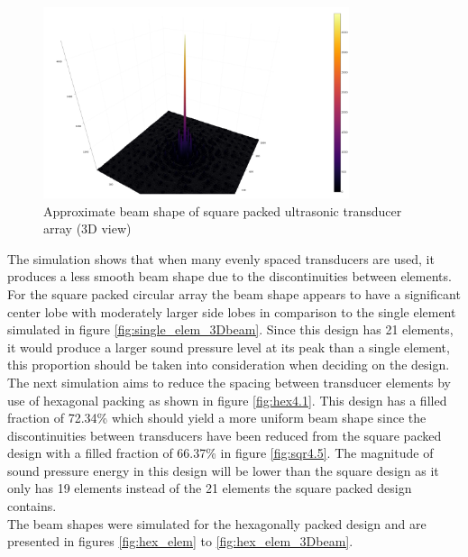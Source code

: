 \begin{figure}[ht!]
    \centering
    \includegraphics[width=0.8\textwidth]{Figures/arraySim/sqr/circ_sqr_beam3d.png}
    \caption{Approximate beam shape of square packed ultrasonic transducer array (3D view)}
    \label{fig:sqr_elem_3Dbeam}
\end{figure}

The simulation shows that when many evenly spaced transducers are used, it produces a less smooth beam shape due to the discontinuities between elements. For the square packed circular array the beam shape appears to have a significant center lobe with moderately larger side lobes in comparison to the single element simulated in figure \ref{fig:single_elem_3Dbeam}. Since this design has 21 elements, it would produce a larger sound pressure level at its peak than a single element, this proportion should be taken into consideration when deciding on the design.\\

The next simulation aims to reduce the spacing between transducer elements by use of hexagonal packing as shown in figure \ref{fig:hex4.1}. This design has a filled fraction of 72.34\% which should yield a more uniform beam shape since the discontinuities between transducers have been reduced from the square packed design with a filled fraction of 66.37\% in figure \ref{fig:sqr4.5}. The magnitude of sound pressure energy in this design will be lower than the square design as it only has 19 elements instead of the 21 elements the square packed design contains.\\
The beam shapes were simulated for the hexagonally packed design and are presented in figures \ref{fig:hex_elem} to \ref{fig:hex_elem_3Dbeam}.

